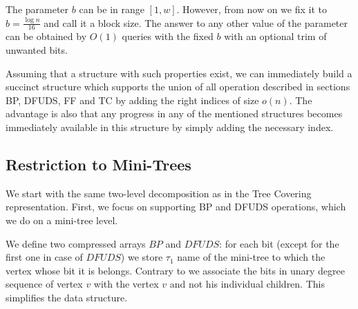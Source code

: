 The parameter $b$ can be in range $[1, w]$.
However, from now on we fix it to $b = \frac{\log n}{16}$ and call it a block size.
The answer to any other value of the parameter can be obtained by $O(1)$ queries with the fixed $b$ with an optional trim of unwanted bits.

Assuming that a structure with such properties exist, we can immediately build a succinct structure which supports the union of all operation described in sections BP, DFUDS, FF and TC by adding the right indices of size $o(n)$.
The advantage is also that any progress in any of the mentioned structures becomes immediately available in this structure by simply adding the necessary index.

\subsection{Restriction to Mini-Trees}

We start with the same two-level decomposition as in the Tree Covering representation.
First, we focus on supporting BP and DFUDS operations, which we do on a mini-tree level.

We define two compressed arrays $BP$ and $DFUDS$: for each bit (except for the first one in case of $DFUDS$) we store $\tau_1$ name of the mini-tree to which the vertex whose bit it is belongs.
Contrary to  we associate the bits in unary degree sequence of vertex $v$ with the vertex $v$ and not his individual children.
This simplifies the data structure.

